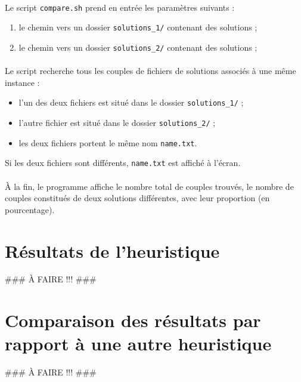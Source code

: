 \paragraph{}
Le script \texttt{compare.sh} prend en entrée les paramètres suivants :
\begin{enumerate}
\item le chemin vers un dossier \texttt{solutions\_1/} contenant des solutions ;
\item le chemin vers un dossier \texttt{solutions\_2/} contenant des solutions ;
\end{enumerate}
\paragraph{}
Le script recherche tous les couples de fichiers de solutions associés à une même instance :
\begin{itemize}
\item l'un des deux fichiers est situé dans le dossier \texttt{solutions\_1/} ;
\item l'autre fichier est situé dans le dossier \texttt{solutions\_2/} ;
\item les deux fichiers portent le même nom \texttt{name.txt}.
\end{itemize}
Si les deux fichiers sont différents, \texttt{name.txt} est affiché à l'écran.
\paragraph{}
À la fin, le programme affiche le nombre total de couples trouvés, le nombre de couples constitués de deux solutions différentes,
avec leur proportion (en pourcentage).


\section{Résultats de l'heuristique}

\#\#\# À FAIRE !!! \#\#\#


\section{Comparaison des résultats par rapport à une autre heuristique}

\#\#\# À FAIRE !!! \#\#\#